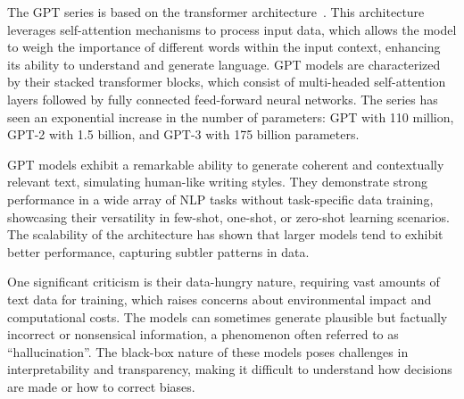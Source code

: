 The GPT series is based on the transformer architecture~\cite{vaswani2023attention}.
This architecture leverages self-attention mechanisms to process input data, which allows the model to weigh the importance of different words within the input context, enhancing its ability to understand and generate language.
GPT models are characterized by their stacked transformer blocks, which consist of multi-headed self-attention layers followed by fully connected feed-forward neural networks.
The series has seen an exponential increase in the number of parameters: GPT with 110 million, GPT-2 with 1.5 billion, and GPT-3 with 175 billion parameters.

GPT models exhibit a remarkable ability to generate coherent and contextually relevant text, simulating human-like writing styles.
They demonstrate strong performance in a wide array of NLP tasks without task-specific data training, showcasing their versatility in few-shot, one-shot, or zero-shot learning scenarios.
The scalability of the architecture has shown that larger models tend to exhibit better performance, capturing subtler patterns in data.

One significant criticism is their data-hungry nature, requiring vast amounts of text data for training, which raises concerns about environmental impact and computational costs.
The models can sometimes generate plausible but factually incorrect or nonsensical information, a phenomenon often referred to as \enquote{hallucination}.
The black-box nature of these models poses challenges in interpretability and transparency, making it difficult to understand how decisions are made or how to correct biases.

